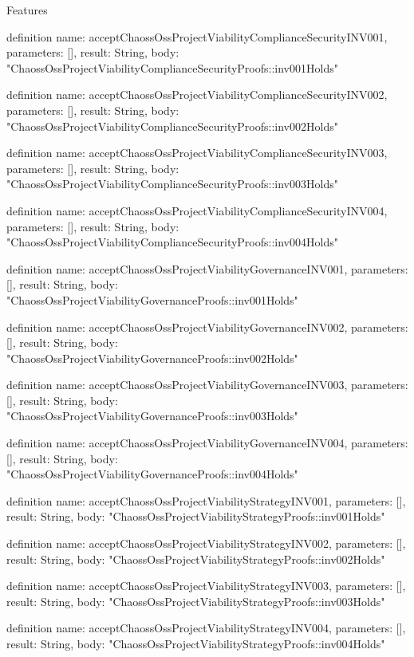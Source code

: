 \begin{lexlean}{Features}
\begin{semanticmodule}
definition{
  name: acceptChaossOssProjectViabilityComplianceSecurityINV001,
  parameters: [],
  result: String,
  body: "ChaossOssProjectViabilityComplianceSecurityProofs::inv001Holds"
}

definition{
  name: acceptChaossOssProjectViabilityComplianceSecurityINV002,
  parameters: [],
  result: String,
  body: "ChaossOssProjectViabilityComplianceSecurityProofs::inv002Holds"
}

definition{
  name: acceptChaossOssProjectViabilityComplianceSecurityINV003,
  parameters: [],
  result: String,
  body: "ChaossOssProjectViabilityComplianceSecurityProofs::inv003Holds"
}

definition{
  name: acceptChaossOssProjectViabilityComplianceSecurityINV004,
  parameters: [],
  result: String,
  body: "ChaossOssProjectViabilityComplianceSecurityProofs::inv004Holds"
}

definition{
  name: acceptChaossOssProjectViabilityGovernanceINV001,
  parameters: [],
  result: String,
  body: "ChaossOssProjectViabilityGovernanceProofs::inv001Holds"
}

definition{
  name: acceptChaossOssProjectViabilityGovernanceINV002,
  parameters: [],
  result: String,
  body: "ChaossOssProjectViabilityGovernanceProofs::inv002Holds"
}

definition{
  name: acceptChaossOssProjectViabilityGovernanceINV003,
  parameters: [],
  result: String,
  body: "ChaossOssProjectViabilityGovernanceProofs::inv003Holds"
}

definition{
  name: acceptChaossOssProjectViabilityGovernanceINV004,
  parameters: [],
  result: String,
  body: "ChaossOssProjectViabilityGovernanceProofs::inv004Holds"
}

definition{
  name: acceptChaossOssProjectViabilityStrategyINV001,
  parameters: [],
  result: String,
  body: "ChaossOssProjectViabilityStrategyProofs::inv001Holds"
}

definition{
  name: acceptChaossOssProjectViabilityStrategyINV002,
  parameters: [],
  result: String,
  body: "ChaossOssProjectViabilityStrategyProofs::inv002Holds"
}

definition{
  name: acceptChaossOssProjectViabilityStrategyINV003,
  parameters: [],
  result: String,
  body: "ChaossOssProjectViabilityStrategyProofs::inv003Holds"
}

definition{
  name: acceptChaossOssProjectViabilityStrategyINV004,
  parameters: [],
  result: String,
  body: "ChaossOssProjectViabilityStrategyProofs::inv004Holds"
}


\end{semanticmodule}
\end{lexlean}
